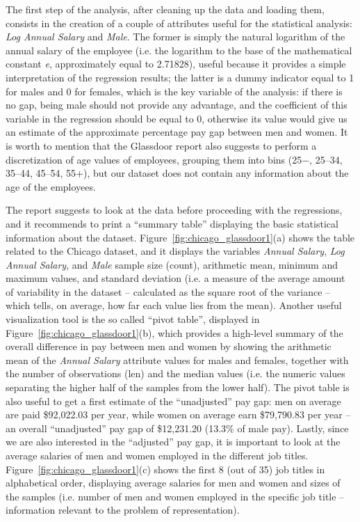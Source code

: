 The first step of the analysis, after cleaning up the data and loading them, consists in the creation of a couple of attributes useful for the statistical analysis: \textit{Log Annual Salary} and \textit{Male}. The former is simply the natural logarithm of the annual salary of the employee (i.e. the logarithm to the base of the mathematical constant \textit{e}, approximately equal to 2.71828), useful because it provides a simple interpretation of the regression results; the latter is a dummy indicator equal to 1 for males and 0 for females, which is the key variable of the analysis: if there is no gap, being male should not provide any advantage, and the coefficient of this variable in the regression should be equal to 0, otherwise its value would give us an estimate of the approximate percentage pay gap between men and women. It is worth to mention that the Glassdoor report also suggests to perform a discretization of age values of employees, grouping them into bins (25\(-\), 25--34, 35--44, 45--54, 55+), but our dataset does not contain any information about the age of the employees.

The report suggests to look at the data before proceeding with the regressions, and it recommends to print a ``summary table'' displaying the basic statistical information about the dataset. Figure~\ref{fig:chicago_glassdoor1}(a) shows the table related to the Chicago dataset, and it displays the variables \textit{Annual Salary}, \textit{Log Annual Salary}, and \textit{Male} sample size (count), arithmetic mean, minimum and maximum values, and standard deviation (i.e. a measure of the average amount of variability in the dataset -- calculated as the square root of the variance -- which tells, on average, how far each value lies from the mean).
Another useful visualization tool is the so called ``pivot table'', displayed in Figure~\ref{fig:chicago_glassdoor1}(b), which provides a high-level summary of the overall difference in pay between men and women by showing the arithmetic mean of the \textit{Annual Salary} attribute values for males and females, together with the number of observations (len) and the median values (i.e. the numeric values separating the higher half of the samples from the lower half). The pivot table is also useful to get a first estimate of the ``unadjusted'' pay gap: men on average are paid \$92,022.03 per year, while women on average earn \$79,790.83 per year -- an overall ``unadjusted'' pay gap of \$12,231.20 (13.3\% of male pay).
Lastly, since we are also interested in the ``adjusted'' pay gap, it is important to look at the average salaries of men and women employed in the different job titles. Figure~\ref{fig:chicago_glassdoor1}(c) shows the first 8 (out of 35) job titles in alphabetical order, displaying average salaries for men and women and sizes of the samples (i.e. number of men and women employed in the specific job title -- information relevant to the problem of representation).


